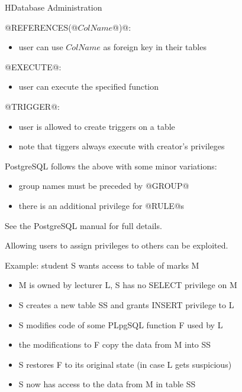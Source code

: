 \begin{lecture}{H}{Database Administration}
\begin{slide}
@REFERENCES(@$ColName$@)@:
\begin{itemize}
\item user can use $ColName$ as foreign key in their tables
\end{itemize}
@EXECUTE@:
\begin{itemize}
\item user can execute the specified function
\end{itemize}
@TRIGGER@:
\begin{itemize}
\item user is allowed to create triggers on a table
\item note that tiggers always execute with creator's privileges
\end{itemize}
\end{slide}

\begin{slide}
PostgreSQL follows the above with some minor variations:
\begin{itemize}
\item group names must be preceded by @GROUP@
\item there is an additional privilege for @RULE@s
\end{itemize}
See the PostgreSQL manual for full details.
\end{slide}

\begin{slide}
Allowing users to assign privileges to others can be exploited.

Example: student S wants access to table of marks M 
\begin{itemize}
\item M is owned by lecturer L, S has no SELECT privilege on M
\item S creates a new table SS and grants INSERT privilege to L
\item S modifies code of some PLpgSQL function F used by L
\item the modifications to F copy the data from M into SS
\item S restores F to its original state
	{\small (in case L gets suspicious)}
\item S now has access to the data from M in table SS
\end{itemize}
\end{slide}


\end{lecture}
